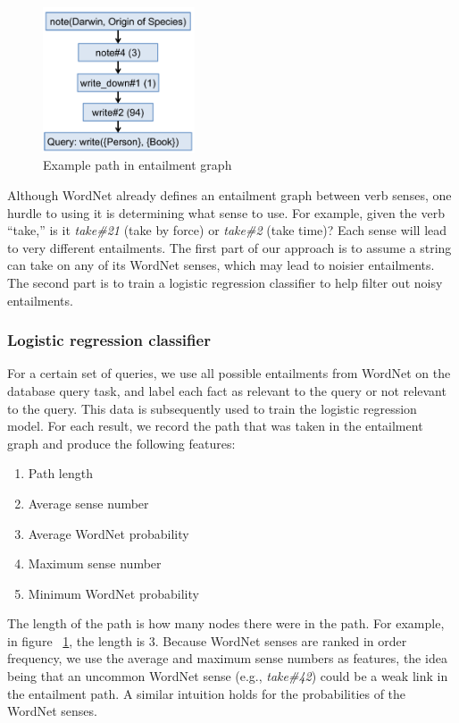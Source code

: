\documentclass{article}
\begin{document}
\begin{figure}[h]
\begin{center}
\includegraphics[width=0.4\textwidth]{figures/example-path.pdf}
\end{center}
\caption{Example path in entailment graph}\label{example-path}
\end{figure}

Although WordNet already defines an entailment graph between verb senses, one hurdle to using it is determining what sense to use. For example, given the verb ``take,'' is it \textit{take\#21} (take by force) or \textit{take\#2} (take time)? Each sense will lead to very different entailments. The first part of our approach is to assume a string can take on any of its WordNet senses, which may lead to noisier entailments. The second part is to train a logistic regression classifier to help filter out noisy entailments.

\subsubsection{Logistic regression classifier}
For a certain set of queries, we use all possible entailments from WordNet on the database query task, and label each fact as relevant to the query or not relevant to the query. This data is subsequently used to train the logistic regression model. For each result, we record the path that was taken in the entailment graph and produce the following features:
\begin{enumerate}
  \item Path length
  \item Average sense number
  \item Average WordNet probability
  \item Maximum sense number
  \item Minimum WordNet probability
\end{enumerate}

The length of the path is how many nodes there were in the path. For example, in figure ~\ref{example-path}, the length is 3. Because WordNet senses are ranked in order frequency, we use the average and maximum sense numbers as features, the idea being that an uncommon WordNet sense (e.g., \textit{take\#42}) could be a weak link in the entailment path. A similar intuition holds for the probabilities of the WordNet senses.
\end{document}
